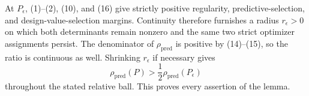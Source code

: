 At \(P_\epsilon\), (1)--(2), (10), and (16) give strictly positive regularity, predictive-selection, and design-value-selection margins. Continuity therefore furnishes a radius \(r_\epsilon>0\) on which both determinants remain nonzero and the same two strict optimizer assignments persist. The denominator of \(\rho_{\mathrm{pred}}\) is positive by (14)--(15), so the ratio is continuous as well. Shrinking \(r_\epsilon\) if necessary gives
\[
 \rho_{\mathrm{pred}}(P)>\frac12\rho_{\mathrm{pred}}(P_\epsilon)
\]
throughout the stated relative ball. This proves every assertion of the lemma.